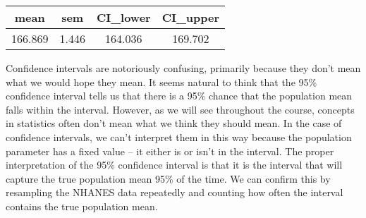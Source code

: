 \documentclass[]{book}
\theoremstyle{definition}
\theoremstyle{definition}
\theoremstyle{definition}
\theoremstyle{remark}
\begin{document}
\begin{longtable}[]{@{}cccc@{}}
\toprule
\begin{minipage}[b]{0.12\columnwidth}\centering\strut
mean\strut
\end{minipage} & \begin{minipage}[b]{0.10\columnwidth}\centering\strut
sem\strut
\end{minipage} & \begin{minipage}[b]{0.14\columnwidth}\centering\strut
CI\_lower\strut
\end{minipage} & \begin{minipage}[b]{0.14\columnwidth}\centering\strut
CI\_upper\strut
\end{minipage}\tabularnewline
\midrule
\endhead
\begin{minipage}[t]{0.12\columnwidth}\centering\strut
166.869\strut
\end{minipage} & \begin{minipage}[t]{0.10\columnwidth}\centering\strut
1.446\strut
\end{minipage} & \begin{minipage}[t]{0.14\columnwidth}\centering\strut
164.036\strut
\end{minipage} & \begin{minipage}[t]{0.14\columnwidth}\centering\strut
169.702\strut
\end{minipage}\tabularnewline
\bottomrule
\end{longtable}

Confidence intervals are notoriously confusing, primarily because they
don't mean what we would hope they mean. It seems natural to think that
the 95\% confidence interval tells us that there is a 95\% chance that
the population mean falls within the interval. However, as we will see
throughout the course, concepts in statistics often don't mean what we
think they should mean. In the case of confidence intervals, we can't
interpret them in this way because the population parameter has a fixed
value -- it either is or isn't in the interval. The proper
interpretation of the 95\% confidence interval is that it is the
interval that will capture the true population mean 95\% of the time. We
can confirm this by resampling the NHANES data repeatedly and counting
how often the interval contains the true population mean.
\end{document}

